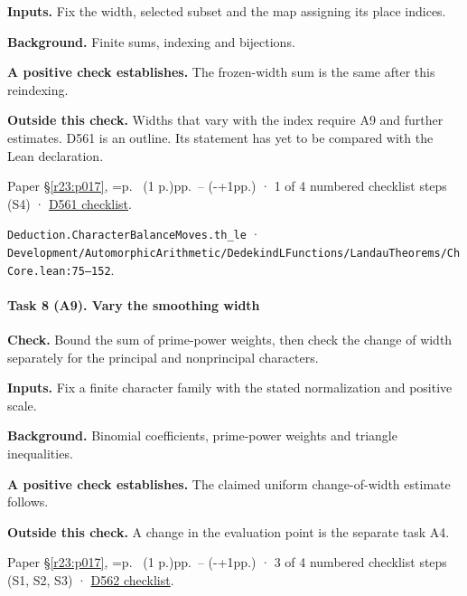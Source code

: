 \textbf{Inputs.} Fix the width, selected subset and the map assigning its place indices.

\textbf{Background.} Finite sums, indexing and bijections.

\textbf{A positive check establishes.} The frozen-width sum is the same after this reindexing.

\textbf{Outside this check.} Widths that vary with the index require A9 and further estimates. D561 is an outline. Its statement has yet to be compared with the Lean declaration.

Paper \S\ref{r23:p017}, \ifnum{}=\relax p.\ \pageref{r24:thick} (1 p.)\else pp.\ \pageref{r24:thick}--\pageref{v5:thick-end} (\number\numexpr{}-+1\relax pp.)\fi{} · 1 of 4 numbered checklist steps (S4) · \href{https://github.com/GunheeC/rh-lean-verification-atlas/blob/v0.1.0/units/D561.check.md}{D561 checklist}.

\nolinkurl{Deduction.CharacterBalanceMoves.th_le} · \nolinkurl{Development/AutomorphicArithmetic/DedekindLFunctions/LandauTheorems/ChCore.lean:75–152}.

\paragraph{Task 8 (A9). Vary the smoothing width}\label{v7:task-8}

\textbf{Check.} Bound the sum of prime-power weights, then check the change of width separately for the principal and nonprincipal characters.

\textbf{Inputs.} Fix a finite character family with the stated normalization and positive scale.

\textbf{Background.} Binomial coefficients, prime-power weights and triangle inequalities.

\textbf{A positive check establishes.} The claimed uniform change-of-width estimate follows.

\textbf{Outside this check.} A change in the evaluation point is the separate task A4.

Paper \S\ref{r23:p017}, \ifnum{}=\relax p.\ \pageref{r24:regular} (1 p.)\else pp.\ \pageref{r24:regular}--\pageref{v5:regular-end} (\number\numexpr{}-+1\relax pp.)\fi{} · 3 of 4 numbered checklist steps (S1, S2, S3) · \href{https://github.com/GunheeC/rh-lean-verification-atlas/blob/v0.1.0/units/D562.check.md}{D562 checklist}.

